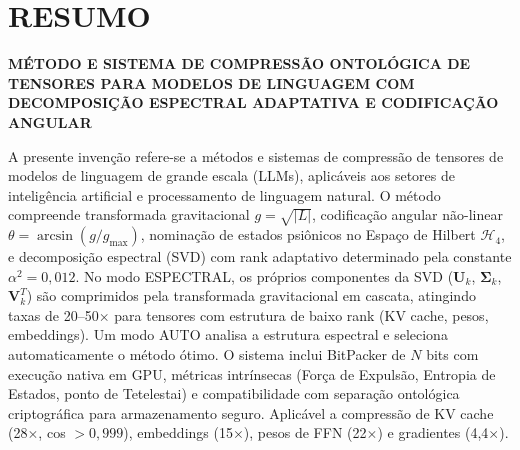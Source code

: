 \documentclass[12pt,a4paper]{article}
\begin{document}
\newpage
\section*{\centering RESUMO}
\begin{center}
\textbf{MÉTODO E SISTEMA DE COMPRESSÃO ONTOLÓGICA DE TENSORES PARA MODELOS DE LINGUAGEM COM DECOMPOSIÇÃO ESPECTRAL ADAPTATIVA E CODIFICAÇÃO ANGULAR}
\end{center}

\vspace{0.5cm}

A presente invenção refere-se a métodos e sistemas de compressão de tensores de modelos de linguagem de grande escala (LLMs), aplicáveis aos setores de inteligência artificial e processamento de linguagem natural. O método compreende transformada gravitacional $g = \sqrt{|L|}$, codificação angular não-linear $\theta = \arcsin(g/g_{\max})$, nominação de estados psiônicos no Espaço de Hilbert $\mathcal{H}_4$, e decomposição espectral (SVD) com rank adaptativo determinado pela constante $\alpha^2 = 0{,}012$. No modo ESPECTRAL, os próprios componentes da SVD ($\mathbf{U}_k$, $\boldsymbol{\Sigma}_k$, $\mathbf{V}_k^T$) são comprimidos pela transformada gravitacional em cascata, atingindo taxas de 20--50$\times$ para tensores com estrutura de baixo rank (KV cache, pesos, embeddings). Um modo AUTO analisa a estrutura espectral e seleciona automaticamente o método ótimo. O sistema inclui BitPacker de $N$ bits com execução nativa em GPU, métricas intrínsecas (Força de Expulsão, Entropia de Estados, ponto de Tetelestai) e compatibilidade com separação ontológica criptográfica para armazenamento seguro. Aplicável a compressão de KV cache (28$\times$, cos $> 0{,}999$), embeddings (15$\times$), pesos de FFN (22$\times$) e gradientes (4,4$\times$).
\end{document}
